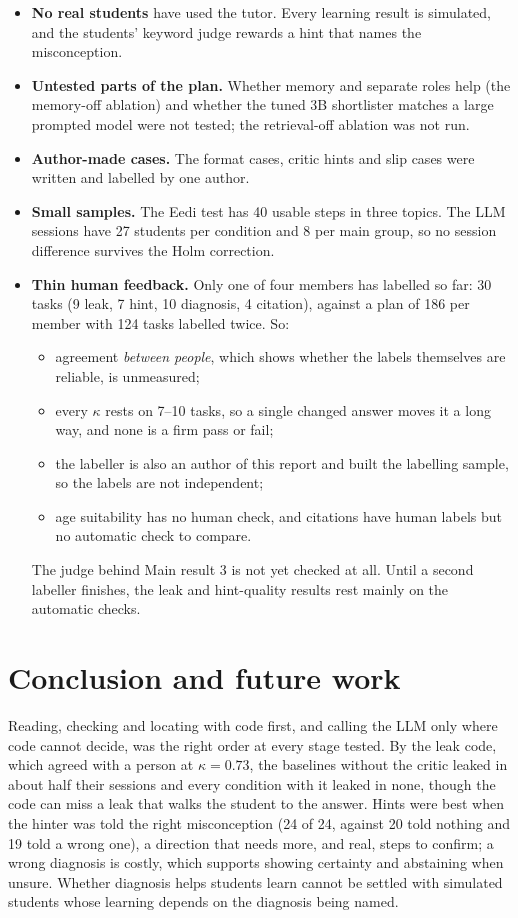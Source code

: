\documentclass[11pt,a4paper]{article}
\begin{document}
\begin{itemize}
  \item \textbf{No real students} have used the tutor. Every learning result is simulated, and the students' keyword judge rewards a hint that names the misconception.
  \item \textbf{Untested parts of the plan.} Whether memory and separate roles help (the memory-off ablation) and whether the tuned 3B shortlister matches a large prompted model were not tested; the retrieval-off ablation was not run.
  \item \textbf{Author-made cases.} The format cases, critic hints and slip cases were written and labelled by one author.
  \item \textbf{Small samples.} The Eedi test has 40 usable steps in three topics. The LLM sessions have 27 students per condition and 8 per main group, so no session difference survives the Holm correction.
  \item \textbf{Thin human feedback.} Only one of four members has labelled so far: 30 tasks (9 leak, 7 hint, 10 diagnosis, 4 citation), against a plan of 186 per member with 124 tasks labelled twice. So:
  \begin{itemize}
    \item agreement \emph{between people}, which shows whether the labels themselves are reliable, is unmeasured;
    \item every $\kappa$ rests on 7--10 tasks, so a single changed answer moves it a long way, and none is a firm pass or fail;
    \item the labeller is also an author of this report and built the labelling sample, so the labels are not independent;
    \item age suitability has no human check, and citations have human labels but no automatic check to compare.
  \end{itemize}
  The judge behind Main result 3 is not yet checked at all. Until a second labeller finishes, the leak and hint-quality results rest mainly on the automatic checks.
\end{itemize}

\section{Conclusion and future work}

Reading, checking and locating with code first, and calling the LLM only where code cannot decide, was the right order at every stage tested. By the leak code, which agreed with a person at $\kappa = 0.73$, the baselines without the critic leaked in about half their sessions and every condition with it leaked in none, though the code can miss a leak that walks the student to the answer. Hints were best when the hinter was told the right misconception (24 of 24, against 20 told nothing and 19 told a wrong one), a direction that needs more, and real, steps to confirm; a wrong diagnosis is costly, which supports showing certainty and abstaining when unsure. Whether diagnosis helps students learn cannot be settled with simulated students whose learning depends on the diagnosis being named.
\end{document}
